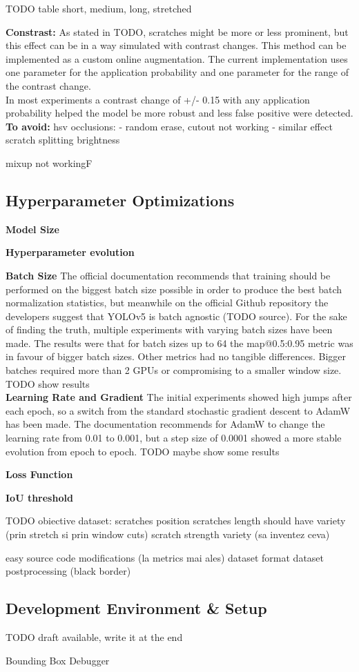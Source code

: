 TODO table short, medium, long, stretched


\textbf{Constrast:} As stated in TODO, scratches might be more or less prominent, but this effect can be in a way simulated with contrast changes. This method can be implemented as a custom online augmentation. The current implementation uses one parameter for the application probability and one parameter for the range of the contrast change. \\
In most experiments a contrast change of +/- 0.15 with any application probability helped the model be more robust and less false positive were detected. \\

\textbf{To avoid:}
hsv
occlusions:
  - random erase, cutout not working
  - similar effect scratch splitting
brightness

mixup not workingF



\subsection{Hyperparameter Optimizations}

\textbf{Model Size}

\textbf{Hyperparameter evolution}

\textbf{Batch Size}
The official documentation recommends that training should be performed on the biggest batch size possible in order to produce the best batch normalization statistics, but meanwhile on the official Github repository the developers suggest that YOLOv5 is batch agnostic (TODO source). For the sake of finding the truth, multiple experiments with varying batch sizes have been made. The results were that for batch sizes up to 64 the map@0.5:0.95 metric was in favour of bigger batch sizes. Other metrics had no tangible differences. Bigger batches required more than 2 GPUs or compromising to a smaller window size. \\
TODO show results \\

\textbf{Learning Rate and Gradient}
The initial experiments showed high jumps after each epoch, so a switch from the standard stochastic gradient descent to AdamW has been made. The documentation recommends for AdamW to change the learning rate from 0.01 to 0.001, but a step size of 0.0001 showed a more stable evolution from epoch to epoch.
TODO maybe show some results

\textbf{Loss Function}


\textbf{IoU threshold}


TODO obiective dataset:
scratches position
scratches length should have variety (prin stretch si prin window cuts)
scratch strength variety (sa inventez ceva)

easy source code modifications (la metrics mai ales)
dataset format
dataset postprocessing (black border)



\subsection{Development Environment \& Setup}
TODO draft available, write it at the end

Bounding Box Debugger
